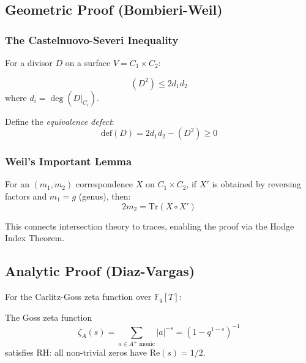 \subsection{Geometric Proof (Bombieri-Weil)}

\subsubsection{The Castelnuovo-Severi Inequality}

For a divisor $D$ on a surface $V = C_1 \times C_2$:

\begin{theorem}
\begin{equation}
(D^2) \leq 2d_1 d_2
\end{equation}
where $d_i = \deg(D|_{C_i})$.
\end{theorem}

Define the \emph{equivalence defect}:
\begin{equation}
\text{def}(D) = 2d_1 d_2 - (D^2) \geq 0
\end{equation}

\subsubsection{Weil's Important Lemma}

\begin{lemma}[Weil]
For an $(m_1, m_2)$ correspondence $X$ on $C_1 \times C_2$, if $X'$ is obtained by reversing factors and $m_1 = g$ (genus), then:
\begin{equation}
2m_2 = \text{Tr}(X \circ X')
\end{equation}
\end{lemma}

This connects intersection theory to traces, enabling the proof via the Hodge Index Theorem.

\subsection{Analytic Proof (Diaz-Vargas)}

For the Carlitz-Goss zeta function over $\mathbb{F}_q[T]$:

\begin{theorem}
The Goss zeta function
\begin{equation}
\zeta_A(s) = \sum_{a \in A^+ \text{ monic}} |a|^{-s} = (1 - q^{1-s})^{-1}
\end{equation}
satisfies RH: all non-trivial zeros have $\text{Re}(s) = 1/2$.
\end{theorem}

